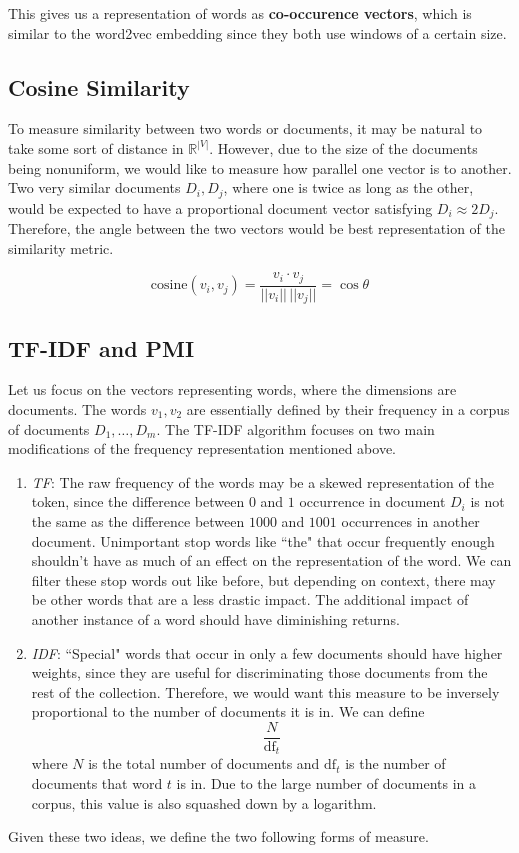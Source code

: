 \documentclass{article}
\begin{document}
      This gives us a representation of words as \textbf{co-occurence vectors}, which is similar to the word2vec embedding since they both use windows of a certain size. 

  \subsection{Cosine Similarity}

    To measure similarity between two words or documents, it may be natural to take some sort of distance in $\mathbb{R}^{|V|}$. However, due to the size of the documents being nonuniform, we would like to measure how parallel one vector is to another. Two very similar documents $D_i, D_j$, where one is twice as long as the other, would be expected to have a proportional document vector satisfying $D_i \approx 2 D_j$. Therefore, the angle between the two vectors would be best representation of the similarity metric. 

    \[\mathrm{cosine}(v_i, v_j) = \frac{v_i \cdot v_j}{||v_i|| \, ||v_j||} = \cos{\theta}\]

  \subsection{TF-IDF and PMI}

    Let us focus on the vectors representing words, where the dimensions are documents. The words $v_1, v_2$ are essentially defined by their frequency in a corpus of documents $D_1, \ldots, D_m$. The TF-IDF algorithm focuses on two main modifications of the frequency representation mentioned above. 
    \begin{enumerate}
      \item \textit{TF}: The raw frequency of the words may be a skewed representation of the token, since the difference between $0$ and $1$ occurrence in document $D_i$ is not the same as the difference between $1000$ and $1001$ occurrences in another document. Unimportant stop words like ``the" that occur frequently enough shouldn't have as much of an effect on the representation of the word. We can filter these stop words out like before, but depending on context, there may be other words that are a less drastic impact. The additional impact of another instance of a word should have diminishing returns. 
      \item \textit{IDF}: ``Special" words that occur in only a few documents should have higher weights, since they are useful for discriminating those documents from the rest of the collection. Therefore, we would want this measure to be inversely proportional to the number of documents it is in. We can define 
      \[\frac{N}{\mathrm{df}_t}\]
      where $N$ is the total number of documents and $\mathrm{df}_t$ is the number of documents that word $t$ is in. Due to the large number of documents in a corpus, this value is also squashed down by a logarithm. 
    \end{enumerate}
    Given these two ideas, we define the two following forms of measure. 
\end{document}
